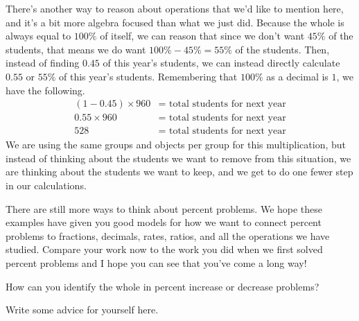 \documentclass{ximera}
\begin{document}
There's another way to reason about operations that we'd like to mention here, and it's a bit more algebra focused than what we just did. Because the whole is always equal to $100\%$ of itself, we can reason that since we don't want $45\%$ of the students, that means we do want $100\% - 45\% = 55\%$ of the students. Then, instead of finding $0.45$ of this year's students, we can instead directly calculate $0.55$ or $55\%$ of this year's students. Remembering that $100\%$ as a decimal is $1$, we have the following.
\begin{align*}
(1 - 0.45) \times 960 &= \textrm{ total students for next year} \\
0.55 \times 960 &= \textrm{ total students for next year} \\
528 &= \textrm{ total students for next year}
\end{align*}
We are using the same groups and objects per group for this multiplication, but instead of thinking about the students we want to remove from this situation, we are thinking about the students we want to keep, and we get to do one fewer step in our calculations. 

There are still more ways to think about percent problems. We hope these examples have given you good models for how we want to connect percent problems to fractions, decimals, rates, ratios, and all the operations we have studied. Compare your work now to the work you did when we first solved percent problems and I hope you can see that you've come a long way!

\begin{question}
How can you identify the whole in percent increase or decrease problems?
\begin{freeResponse}
Write some advice for yourself here.
\end{freeResponse}
\end{question}
\end{document}
